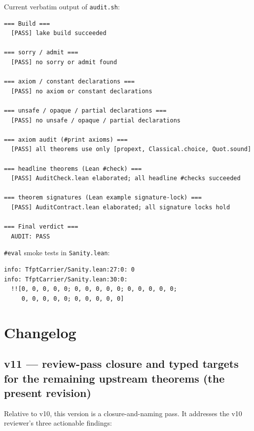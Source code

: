 \documentclass[11pt,a4paper]{article}
\begin{document}
Current verbatim output of \texttt{audit.sh}:

\begin{lstlisting}
=== Build ===
  [PASS] lake build succeeded

=== sorry / admit ===
  [PASS] no sorry or admit found

=== axiom / constant declarations ===
  [PASS] no axiom or constant declarations

=== unsafe / opaque / partial declarations ===
  [PASS] no unsafe / opaque / partial declarations

=== axiom audit (#print axioms) ===
  [PASS] all theorems use only [propext, Classical.choice, Quot.sound]

=== headline theorems (Lean #check) ===
  [PASS] AuditCheck.lean elaborated; all headline #checks succeeded

=== theorem signatures (Lean example signature-lock) ===
  [PASS] AuditContract.lean elaborated; all signature locks hold

=== Final verdict ===
  AUDIT: PASS
\end{lstlisting}

\texttt{\#eval} smoke tests in \texttt{Sanity.lean}:

\begin{lstlisting}
info: TfptCarrier/Sanity.lean:27:0: 0
info: TfptCarrier/Sanity.lean:30:0:
  !![0, 0, 0, 0, 0; 0, 0, 0, 0, 0; 0, 0, 0, 0, 0;
     0, 0, 0, 0, 0; 0, 0, 0, 0, 0]
\end{lstlisting}

\section{Changelog}
\label{sec:changes}

\subsection*{v11 --- review-pass closure and typed targets for
the remaining upstream theorems (the present revision)}

Relative to v10, this version is a closure-and-naming pass. It
addresses the v10 reviewer's three actionable findings:
\end{document}
